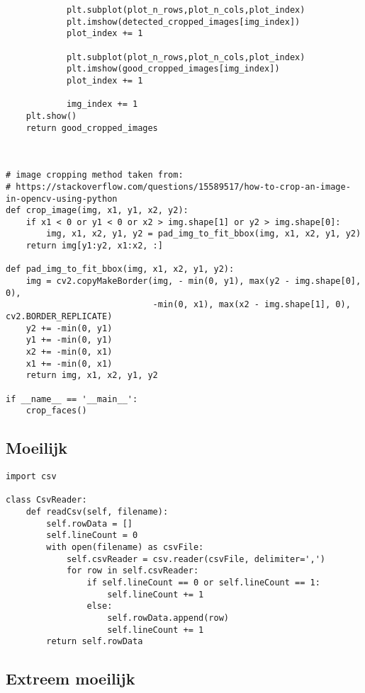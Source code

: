 \begin{verbatim}
            plt.subplot(plot_n_rows,plot_n_cols,plot_index)
            plt.imshow(detected_cropped_images[img_index])
            plot_index += 1

            plt.subplot(plot_n_rows,plot_n_cols,plot_index)
            plt.imshow(good_cropped_images[img_index])
            plot_index += 1

            img_index += 1
    plt.show()
    return good_cropped_images



# image cropping method taken from:
# https://stackoverflow.com/questions/15589517/how-to-crop-an-image-in-opencv-using-python
def crop_image(img, x1, y1, x2, y2):
    if x1 < 0 or y1 < 0 or x2 > img.shape[1] or y2 > img.shape[0]:
        img, x1, x2, y1, y2 = pad_img_to_fit_bbox(img, x1, x2, y1, y2)
    return img[y1:y2, x1:x2, :]

def pad_img_to_fit_bbox(img, x1, x2, y1, y2):
    img = cv2.copyMakeBorder(img, - min(0, y1), max(y2 - img.shape[0], 0),
                             -min(0, x1), max(x2 - img.shape[1], 0), cv2.BORDER_REPLICATE)
    y2 += -min(0, y1)
    y1 += -min(0, y1)
    x2 += -min(0, x1)
    x1 += -min(0, x1)
    return img, x1, x2, y1, y2

if __name__ == '__main__':
    crop_faces()
\end{verbatim}

\subsection{Moeilijk}
\label{bijlage:moeilijk}

\begin{verbatim}
import csv

class CsvReader:
    def readCsv(self, filename):
        self.rowData = []
        self.lineCount = 0
        with open(filename) as csvFile:
            self.csvReader = csv.reader(csvFile, delimiter=',')
            for row in self.csvReader:
                if self.lineCount == 0 or self.lineCount == 1:
                    self.lineCount += 1
                else:
                    self.rowData.append(row)
                    self.lineCount += 1
        return self.rowData
\end{verbatim}

\subsection{Extreem moeilijk}
\label{bijlage:extreem-moeilijk}

